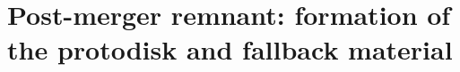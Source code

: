 \section{Post-merger remnant: formation of the protodisk and fallback material}
\label{sec:diskanalysis}


%	
%
%	

%	
%
%	
%
%	

